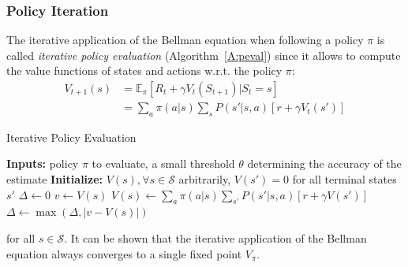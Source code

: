 \subsubsection{Policy Iteration}
The iterative application of the Bellman equation when following a policy $\pi$ is called \textit{iterative policy evaluation} (Algorithm~\ref{A:peval}) since it allows to compute the value functions of states and actions w.r.t. the policy $\pi$:
\begin{align}
 V_{t+1} (s) &= \mathbb{E}_\pi[R_t + \gamma V_t(S_{t+1}) | S_t = s]\nonumber\\
             &= \sum_a \pi(a|s) \sum_s P(s' | s, a)[r + \gamma V_t(s')]
\end{align}
\begin{algorithm}[t]
 \caption{Iterative Policy Evaluation}
 \begin{algorithmic}[1]\label{A:peval}
  \STATE \textbf{Inputs:} policy $\pi$ to evaluate, a small threshold $\theta$ determining the accuracy of the estimate
  \STATE \textbf{Initialize:} $V(s), \forall s \in \mathcal{S}$ arbitrarily, $V(s') = 0$ for all terminal states $s'$
  \REPEAT
  \STATE $\Delta \leftarrow 0$
  \STATE $v \leftarrow V(s)$
  \STATE $V(s) \leftarrow \sum_a \pi(a|s) \sum_{s'} P(s'|s,a)[r + \gamma V(s')]$
  \STATE $\Delta \leftarrow \max(\Delta, |v - V(s)|)$
  \ENDFOR
  \UNTIL{$\Delta < \theta$}
 \end{algorithmic}
\end{algorithm}
for all $s \in \mathcal{S}$. It can be shown that the iterative application of the Bellman equation always converges to a single fixed point $V_\pi$.

